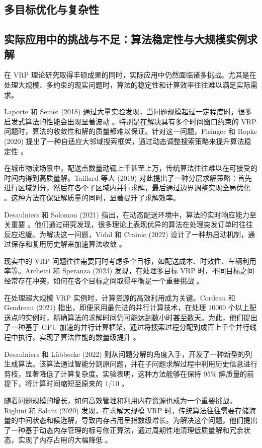 \documentclass[12pt,a4paper,twoside]{ctexbook}
\begin{document}
\subsection{多目标优化与复杂性}
\subsection{实际应用中的挑战与不足：算法稳定性与大规模实例求解}
在 VRP 理论研究取得丰硕成果的同时，实际应用中仍然面临诸多挑战。尤其是在处理大规模、多约束的现实问题时，算法的稳定性和计算效率往往难以满足实际需求。

Laporte 和 Semet (2018) 通过大量实验发现，当问题规模超过一定程度时，很多启发式算法的性能会出现显著波动 \cite{12}。特别是在解决具有多个时间窗口约束的 VRP 问题时，算法的收敛性和解的质量都难以保证。针对这一问题，Pisinger 和 Ropke (2020) 提出了一种自适应大邻域搜索框架，通过动态调整搜索策略来提升算法稳定性 \cite{13}。

在城市物流场景中，配送点数量动辄上千甚至上万，传统算法往往难以在可接受的时间内得到高质量解。Taillard 等人 (2019) 对此提出了一种分层求解策略：首先进行区域划分，然后在各个子区域内并行求解，最后通过边界调整实现全局优化 \cite{14}。这种方法在保证解质量的同时，显著提升了求解效率。

Desaulniers 和 Solomon (2021) 指出，在动态配送环境中，算法的实时响应能力至关重要 \cite{15}。他们通过研究发现，很多理论上表现优异的算法在处理突发订单时往往反应迟缓。为解决这一问题，Vidal 和 Crainic (2022) 设计了一种热启动机制，通过保存和复用历史解来加速算法收敛 \cite{16}。

现实中的 VRP 问题往往需要同时考虑多个目标，如配送成本、时效性、车辆利用率等。Archetti 和 Speranza (2023) 发现，在处理多目标 VRP 时，不同目标之间经常存在冲突，如何在各个目标之间取得平衡是一个重要挑战 \cite{17}。

在处理超大规模 VRP 实例时，计算资源的高效利用成为关键。Cordeau 和 Gendreau (2021) 指出，即便采用最先进的并行计算技术，在处理 10000 个以上配送点的实例时，精确算法的求解时间仍可能达到数小时甚至数天。为此，他们提出了一种基于 GPU 加速的并行计算框架，通过将搜索过程分配到成百上千个并行线程中执行，实现了算法性能的数量级提升 \cite{18}。

Desaulniers 和 Lübbecke (2022) 则从问题分解的角度入手，开发了一种新型的列生成算法。该算法通过智能分割原问题，并在子问题求解过程中利用历史信息进行剪枝，显著降低了计算复杂度。实验表明，这种方法能够在保持 95\% 解质量的前提下，将计算时间缩短至原来的 1/10 \cite{19}。

随着问题规模的增长，如何高效管理和利用内存资源也成为一个重要挑战。Righini 和 Salani (2020) 发现，在求解大规模 VRP 时，传统算法往往需要存储海量的中间状态和候选解，导致内存占用呈指数级增长。为解决这个问题，他们提出了一种基于动态内存管理的标号修正算法，通过周期性地清理低质量解和冗余状态，实现了内存占用的大幅降低 \cite{20}。
\end{document}

